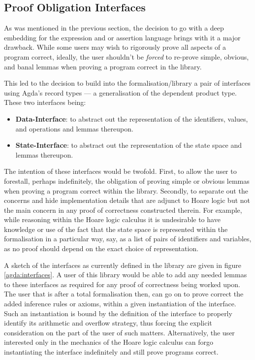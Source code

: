 \documentclass[oneside,12pt]{article}
\begin{document}
\subsection{Proof Obligation Interfaces}


As was mentioned in the previous section, the decision to go with a deep embedding for the expression and or assertion language brings with it a major drawback. While some users may wish to rigorously prove all aspects of a program correct, ideally, the user shouldn't be \emph{forced} to re-prove simple, obvious, and banal lemmas when proving a program correct in the library.

This led to the decision to build into the formalisation/library a pair of interfaces using Agda's record types --- a generalisation of the dependent product type. These two interfaces being:


\begin{itemize}
\item \textbf{Data-Interface}: to abstract out the representation of the identifiers, values, and operations and lemmas thereupon.
\item \textbf{State-Interface}: to abstract out the representation of the state space and lemmas thereupon.
\end{itemize}


The intention of these interfaces would be twofold. First, to allow the user to forestall, perhaps indefinitely, the obligation of proving simple or obvious lemmas when proving a program correct within the library. Secondly, to separate out the concerns and hide implementation details that are adjunct to Hoare logic but not the main concern in any proof of correctness constructed therein. For example, while reasoning within the Hoare logic calculus it is undesirable to have knowledge or use of the fact that the state space is represented within the formalisation in a particular way, say, as a list of pairs of identifiers and variables, as no proof should depend on the exact choice of representation.

A sketch of the interfaces as currently defined in the library are given in figure \ref{agda:interfaces}. A user of this library would be able to add any needed lemmas to these interfaces as required for any proof of correctness being worked upon. The user that is after a total formalisation then, can go on to prove correct the added inference rules or axioms, within a given instantiation of the interface. Such an instantiation is bound by the definition of the interface to properly identify its arithmetic and overflow strategy, thus forcing the explicit consideration on the part of the user of such matters. Alternatively, the user interested only in the mechanics of the Hoare logic calculus can forgo instantiating the interface indefinitely and still prove programs correct.
\end{document}
